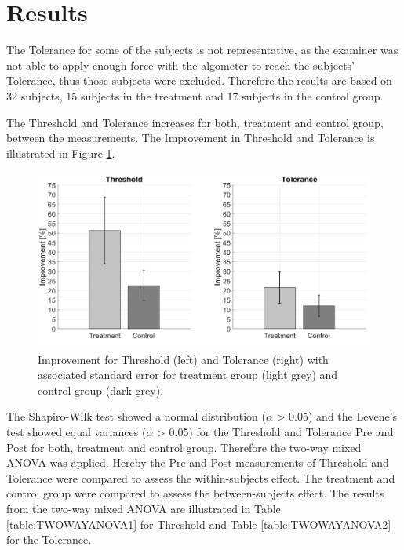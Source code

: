 \section{Results}
The Tolerance for some of the subjects is not representative, as the examiner was not able to apply enough force with the algometer to reach the subjects' Tolerance, thus those subjects were excluded. 
Therefore the results are based on 32 subjects, 15 subjects in the treatment and 17 subjects in the control group. 

The Threshold and Tolerance increases for both, treatment and control group, between the measurements. The Improvement in Threshold and Tolerance is illustrated in Figure \ref{fig:barplot}. 

\begin{figure}[H]
\centering
\includegraphics[width=1\columnwidth]{../figures/barplot.png}
\caption{Improvement for Threshold (left) and Tolerance (right) with associated standard error for treatment group (light grey) and control group (dark grey).}
\label{fig:barplot}
\end{figure} 

The Shapiro-Wilk test showed a normal distribution ($\alpha$ > 0.05) and the Levene's test showed equal variances ($\alpha$ > 0.05) for the Threshold and Tolerance Pre and Post for both, treatment and control group. Therefore the two-way mixed ANOVA was applied. Hereby the Pre and Post measurements of Threshold and Tolerance were compared to assess the within-subjects effect. The treatment and control group were compared to assess the between-subjects effect. The results from the two-way mixed ANOVA are illustrated in Table \ref{table:TWOWAYANOVA1} for Threshold and Table \ref{table:TWOWAYANOVA2} for the Tolerance. 

